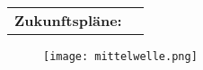 \ifoddpage
	\def\tablex{-1.25cm}
\else
	\def\tablex{5cm}
\fi
\def\tablewidth{\textwidth}

\vskip 10cm
\hspace*{\tablex}
\Large{\begin{tabular}{@{}ll@{}}
		\textbf{Zukunftspläne:} & \multicolumn{1}{p{\tablewidth}}{\stdfuture} \\
	\end{tabular}}

\begin{figure}[H]
	\hspace*{-2.5cm}\texttt{[image: mittelwelle.png]}
\end{figure}
